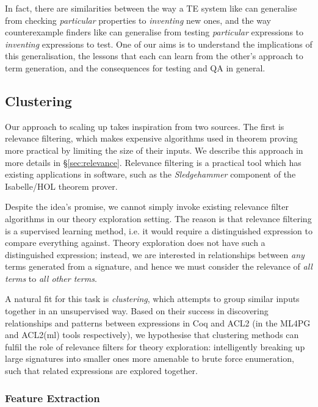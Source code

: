 In fact, there are similarities between the way a TE system like \qspec{} can generalise from checking \emph{particular} properties to \emph{inventing} new ones, and the way counterexample finders like \qcheck{} can generalise from testing \emph{particular} expressions to \emph{inventing} expressions to test. One of our aims is to understand the implications of this generalisation, the lessons that each can learn from the other's approach to term generation, and the consequences for testing and QA in general.

\subsection{Clustering}
\label{sec:clustering}

Our approach to scaling up \qspec{} takes inspiration from two sources. The first is relevance filtering, which makes expensive algorithms used in theorem proving more practical by limiting the size of their inputs. We describe this approach in more details in \S \ref{sec:relevance}. Relevance filtering is a practical tool which has existing applications in software, such as the \emph{Sledgehammer} component of the Isabelle/HOL theorem prover.

Despite the idea's promise, we cannot simply invoke existing relevance filter algorithms in our theory exploration setting. The reason is that relevance filtering is a supervised learning method, i.e. it would require a distinguished expression to compare everything against. Theory exploration does not have such a distinguished expression; instead, we are interested in relationships between \emph{any} terms generated from a signature, and hence we must consider the relevance of \emph{all terms} to \emph{all other terms}.

A natural fit for this task is \emph{clustering}, which attempts to group similar inputs together in an unsupervised way. Based on their success in discovering relationships and patterns between expressions in Coq and ACL2 (in the ML4PG and ACL2(ml) tools respectively), we hypothesise that clustering methods can fulfil the role of relevance filters for theory exploration: intelligently breaking up large signatures into smaller ones more amenable to brute force enumeration, such that related expressions are explored together.

\subsubsection{Feature Extraction}
\label{sec:featureextraction}

